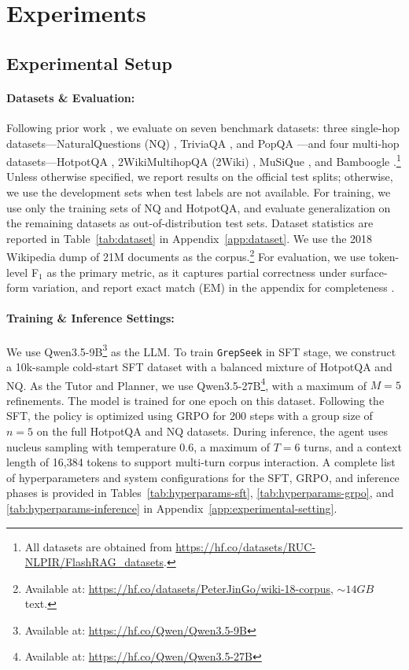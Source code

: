 \documentclass{article} %
\newcommand{\ourmethod}{\texttt{GrepSeek}\xspace}
\begin{document}
\section{Experiments}

\subsection{Experimental Setup}

\paragraph{Datasets \& Evaluation:}

Following prior work \citep{search-r1}, we evaluate on seven benchmark datasets: three single-hop datasets---NaturalQuestions (NQ) \citep{nq}, TriviaQA \citep{triviaqa}, and PopQA \citep{popqa}---and four multi-hop datasets---HotpotQA \citep{hotpotqa}, 2WikiMultihopQA (2Wiki) \citep{2wiki}, MuSiQue \citep{musique}, and Bamboogle \citep{bamboogle}.\footnote{All datasets are obtained from \url{https://hf.co/datasets/RUC-NLPIR/FlashRAG_datasets}.} Unless otherwise specified, we report results on the official test splits; otherwise, we use the development sets when test labels are not available. For training, we use only the training sets of NQ and HotpotQA, and evaluate generalization on the remaining datasets as out-of-distribution test sets. Dataset statistics are reported in Table~\ref{tab:dataset} in Appendix~\ref{app:dataset}. We use the 2018 Wikipedia dump \citep{karpukhin2020dense}  of 21M documents as the corpus.\footnote{Available at: \url{https://hf.co/datasets/PeterJinGo/wiki-18-corpus}, $\sim14GB$ text.} For evaluation, we use token-level F$_1$ as the primary metric, as it captures partial correctness under surface-form variation, and report exact match (EM) in the appendix for completeness \citep{rajpurkar-etal-2016-squad}.


\paragraph{Training \& Inference Settings:}

We use Qwen3.5-9B\footnote{Available at: \url{https://hf.co/Qwen/Qwen3.5-9B}} \citep{qwen3.5} as the LLM. To train \ourmethod in SFT stage, we construct a 10k-sample cold-start SFT dataset with a balanced mixture of HotpotQA and NQ. As the Tutor and Planner, we use Qwen3.5-27B\footnote{Available at: \url{https://hf.co/Qwen/Qwen3.5-27B}}, with a maximum of $M=5$ refinements. The model is trained for one epoch on this dataset. Following the SFT, the policy is optimized using GRPO \citep{grpo} for 200 steps with a group size of $n=5$ on the full HotpotQA and NQ datasets. During inference, the agent uses nucleus sampling \citep{Holtzman2020The} with temperature $0.6$, a maximum of $T=6$ turns, and a context length of 16{,}384 tokens to support multi-turn corpus interaction. A complete list of hyperparameters and system configurations for the SFT, GRPO, and inference phases is provided in Tables~\ref{tab:hyperparams-sft}, \ref{tab:hyperparams-grpo}, and \ref{tab:hyperparams-inference} in Appendix~\ref{app:experimental-setting}.
\end{document}
